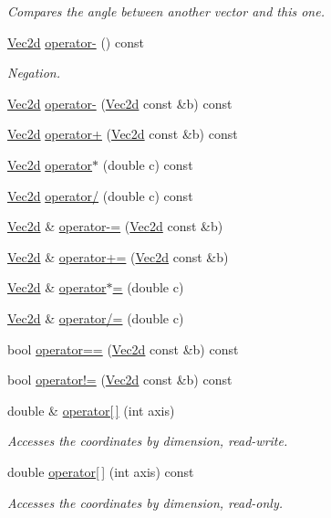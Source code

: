 \begin{DoxyCompactItemize}
\begin{DoxyCompactList}\small\item\em Compares the angle between another vector and this one. \end{DoxyCompactList}\item 
\hyperlink{class_vec2d}{Vec2d} \hyperlink{class_vec2d_a10e4dfd3010b1eea96aeb045b8af4f65}{operator-\/} () const 
\begin{DoxyCompactList}\small\item\em Negation. \end{DoxyCompactList}\item 
\hyperlink{class_vec2d}{Vec2d} \hyperlink{class_vec2d_aeb19fb7a14e6d27297824df84fbf4a4c}{operator-\/} (\hyperlink{class_vec2d}{Vec2d} const \&b) const 
\item 
\hyperlink{class_vec2d}{Vec2d} \hyperlink{class_vec2d_ac8f8d43ccb2562909f47c0441f7360af}{operator+} (\hyperlink{class_vec2d}{Vec2d} const \&b) const 
\item 
\hyperlink{class_vec2d}{Vec2d} \hyperlink{class_vec2d_a3dbad3187365573e43c0d7dc62c58747}{operator$\ast$} (double c) const 
\item 
\hyperlink{class_vec2d}{Vec2d} \hyperlink{class_vec2d_ac087cede4e983fb255efdf8173a47fff}{operator/} (double c) const 
\item 
\hyperlink{class_vec2d}{Vec2d} \& \hyperlink{class_vec2d_ae056531ecffb888dd44cf2380e2a9d61}{operator-\/=} (\hyperlink{class_vec2d}{Vec2d} const \&b)
\item 
\hyperlink{class_vec2d}{Vec2d} \& \hyperlink{class_vec2d_a0306588e0dfdb32628553adae104ae46}{operator+=} (\hyperlink{class_vec2d}{Vec2d} const \&b)
\item 
\hyperlink{class_vec2d}{Vec2d} \& \hyperlink{class_vec2d_a77450821f971f2680fbd32cd02a74ffe}{operator$\ast$=} (double c)
\item 
\hyperlink{class_vec2d}{Vec2d} \& \hyperlink{class_vec2d_a4187caf884060223bc9a48cdd7265a99}{operator/=} (double c)
\item 
bool \hyperlink{class_vec2d_a88da96e8386856f5369dd1ca665c0244}{operator==} (\hyperlink{class_vec2d}{Vec2d} const \&b) const 
\item 
bool \hyperlink{class_vec2d_a1ca44b211b73ac6d98ca079c0547efd3}{operator!=} (\hyperlink{class_vec2d}{Vec2d} const \&b) const 
\item 
double \& \hyperlink{class_vec2d_acb2649964c8ef5e078fe754b315341f2}{operator\mbox{[}$\,$\mbox{]}} (int axis)
\begin{DoxyCompactList}\small\item\em Accesses the coordinates by dimension, read-\/write. \end{DoxyCompactList}\item 
double \hyperlink{class_vec2d_a4d20e4e76750dc6989a7626343fbf309}{operator\mbox{[}$\,$\mbox{]}} (int axis) const 
\begin{DoxyCompactList}\small\item\em Accesses the coordinates by dimension, read-\/only. \end{DoxyCompactList}\end{DoxyCompactItemize}
